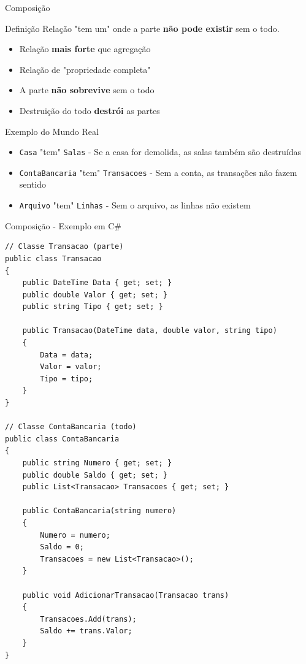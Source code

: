 \documentclass[aspectratio=169]{beamer}
\begin{document}
\begin{frame}{Composição}
\begin{block}{Definição}
Relação "tem um" onde a parte \textbf{não pode existir} sem o todo.
\end{block}

\vspace{0.5cm}
\begin{itemize}
\item Relação \textbf{mais forte} que agregação
\item Relação de "propriedade completa"
\item A parte \textbf{não sobrevive} sem o todo
\item Destruição do todo \textbf{destrói} as partes
\end{itemize}

\vspace{0.5cm}
\begin{exampleblock}{Exemplo do Mundo Real}
\begin{itemize}
\item \texttt{Casa} "tem" \texttt{Salas} - Se a casa for demolida, as salas também são destruídas
\item \texttt{ContaBancaria} "tem" \texttt{Transacoes} - Sem a conta, as transações não fazem sentido
\item \texttt{Arquivo} "tem" \texttt{Linhas} - Sem o arquivo, as linhas não existem
\end{itemize}
\end{exampleblock}
\end{frame}

\begin{frame}{Composição - Exemplo em C\#}
\begin{lstlisting}
// Classe Transacao (parte)
public class Transacao
{
    public DateTime Data { get; set; }
    public double Valor { get; set; }
    public string Tipo { get; set; }
    
    public Transacao(DateTime data, double valor, string tipo)
    {
        Data = data;
        Valor = valor;
        Tipo = tipo;
    }
}

// Classe ContaBancaria (todo)
public class ContaBancaria
{
    public string Numero { get; set; }
    public double Saldo { get; set; }
    public List<Transacao> Transacoes { get; set; }
    
    public ContaBancaria(string numero)
    {
        Numero = numero;
        Saldo = 0;
        Transacoes = new List<Transacao>();
    }
    
    public void AdicionarTransacao(Transacao trans)
    {
        Transacoes.Add(trans);
        Saldo += trans.Valor;
    }
}
\end{lstlisting}
\end{frame}
\end{document}

